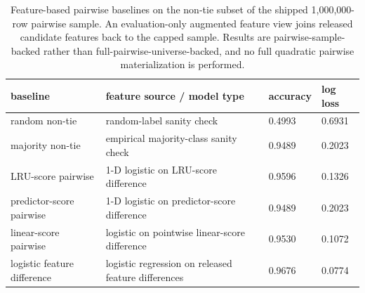 \begin{table}[t]
  \centering
  \footnotesize
  \caption{Feature-based pairwise baselines on the non-tie subset of the shipped 1,000,000-row pairwise sample. An evaluation-only augmented feature view joins released candidate features back to the capped sample. Results are pairwise-sample-backed rather than full-pairwise-universe-backed, and no full quadratic pairwise materialization is performed.}
  \label{tab:pairwise-feature-baselines}
  \begin{tabularx}{\columnwidth}{@{}P{0.24\columnwidth}P{0.34\columnwidth}P{0.16\columnwidth}P{0.14\columnwidth}@{}}
    \toprule
    baseline & feature source / model type & accuracy & log loss \\
    \midrule
    random non-tie & random-label sanity check & 0.4993 & 0.6931 \\
    majority non-tie & empirical majority-class sanity check & 0.9489 & 0.2023 \\
    LRU-score pairwise & 1-D logistic on LRU-score difference & 0.9596 & 0.1326 \\
    predictor-score pairwise & 1-D logistic on predictor-score difference & 0.9489 & 0.2023 \\
    linear-score pairwise & logistic on pointwise linear-score difference & 0.9530 & 0.1072 \\
    logistic feature difference & logistic regression on released feature differences & 0.9676 & 0.0774 \\
    \bottomrule
  \end{tabularx}
\end{table}
